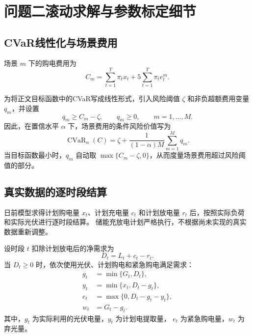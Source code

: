 \section{问题二滚动求解与参数标定细节}
\label{app:q2_solution_details}

\subsection{CVaR线性化与场景费用}
\label{app:q2_cvar_settlement}

场景 $m$ 下的购电费用为
\begin{equation}
C_m
=
\sum_{t=1}^{T}\pi_t x_t
+
5\sum_{t=1}^{T}\pi_t e_t^m .
\label{eq:app_q2_scenario_cost}
\end{equation}

为将正文目标函数中的CVaR写成线性形式，引入风险阈值
$\zeta$ 和非负超额费用变量 $q_m$，并设置
\begin{equation}
q_m\geq C_m-\zeta,
\qquad
q_m\geq0,
\qquad m=1,\ldots,M .
\label{eq:app_q2_cvar_linearization}
\end{equation}
因此，在置信水平 $\alpha$ 下，场景费用的条件风险价值写为
\begin{equation}
\operatorname{CVaR}_{\alpha}(C)
=
\zeta+
\frac{1}{(1-\alpha)M}
\sum_{m=1}^{M}q_m .
\label{eq:app_q2_cvar}
\end{equation}
当目标函数最小时，$q_m$ 自动取
$\max\{C_m-\zeta,0\}$，从而度量场景费用超过风险阈值的部分。

\subsection{真实数据的逐时段结算}

日前模型求得计划购电量 $x_t$、计划充电量 $c_t$ 和计划放电量
$r_t$ 后，按照实际负荷和实际光伏进行逐时段结算。
储能充放电计划严格执行，不根据尚未实现的真实数据重新调整。

设时段 $t$ 扣除计划放电后的净需求为
\begin{equation}
D_t=L_t+c_t-r_t .
\label{eq:app_q2_net_demand}
\end{equation}
当 $D_t\geq0$ 时，依次使用光伏、计划购电和紧急购电满足需求：
\begin{equation}
\begin{aligned}
g_t&=\min\{G_t,D_t\},\\
y_t&=\min\{x_t,D_t-g_t\},\\
e_t&=\max\{0,D_t-g_t-y_t\},\\
w_t&=G_t-g_t .
\end{aligned}
\label{eq:app_q2_actual_settlement}
\end{equation}
其中，$g_t$ 为实际利用的光伏电量，$y_t$ 为计划电提取量，
$e_t$ 为紧急购电量，$w_t$ 为弃光量。

